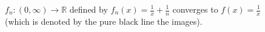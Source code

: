 \documentclass[oneside]{amsart}
\theoremstyle{definition}
\newcommand{\rr}{\mathbb R}
\begin{document}
\begin{figure}[h!]
  
\caption{$f_n \colon (0, \infty) \to \rr$ defined by $f_n(x) = \frac{1}{x}+\frac{1}{n}$ converges to $f(x) = \frac{1}{x}$ (which is denoted by the pure black line the images).}
\end{figure}
\end{document}
